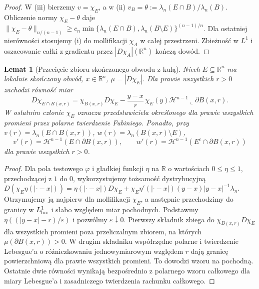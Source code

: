 \documentclass[11pt,a4paper,oneside]{book}
\numberwithin{equation}{chapter}
\theoremstyle{plain}
\newtheorem{lemat}[twierdzenie]{Lemat}
\theoremstyle{definition}
\theoremstyle{remark}
\begin{document}
\begin{proof}
W (iii) bierzemy $v=\chi_E$, a w (ii)
$v_B=\theta:=\lambda_n(E\cap B)/\lambda_n(B)$.
Obliczenie normy $\chi_E-\theta$ daje
$\|\chi_E-\theta\|_{n/(n-1)}\ge
 c_n\min\{\lambda_n(E\cap B),\lambda_n(B\setminus E)\}^{(n-1)/n}$.
Dla ostatniej nierówności stosujemy (i) do
mollifikacji $\chi_A$ w całej przestrzeni.
Zbieżność w $L^1$ i oszacowanie całki z gradientu
przez $|D\chi_A|(\mathbb R^n)$ kończą dowód.
\end{proof}

\begin{lemat}[Przecięcie zbioru skończonego obwodu z kulą]
\label{lem:dg-ball-cut}
Niech $E\subseteq\mathbb R^n$ ma lokalnie skończony obwód,
$x\in\mathbb R^n$, $\mu=|D\chi_E|$.
Dla prawie wszystkich $r>0$ zachodzi równość miar
\[
 D\chi_{E\cap B(x,r)}
 =\chi_{B(x,r)}D\chi_E
 -\frac{y-x}{r}\,\chi_E(y)
 \mathcal H^{n-1}\llcorner\partial B(x,r).
\]
W ostatnim członie $\chi_E$ oznacza przedstawiciela
określonego dla prawie wszystkich promieni przez
polarne twierdzenie Fubiniego. Ponadto, przy
$v(r)=\lambda_n(E\cap B(x,r))$,
$w(r)=\lambda_n(B(x,r)\setminus E)$,
\[
 v'(r)=\mathcal H^{n-1}(E\cap\partial B(x,r)),\qquad
 w'(r)=\mathcal H^{n-1}(E^c\cap\partial B(x,r))
\]
dla prawie wszystkich $r>0$.
\end{lemat}
\begin{proof}
Dla pola testowego $\varphi$ i gładkiej
funkcji $\eta$ na $\mathbb R$ o wartościach
$0\le\eta\le1$, przechodzącej z $1$ do $0$,
wykorzystujemy tożsamość dystrybucyjną
$D(\chi_E\eta(|\cdot-x|))=
\eta(|\cdot-x|)D\chi_E+
\chi_E\eta'(|\cdot-x|)(y-x)|y-x|^{-1}\lambda_n$.
Otrzymujemy ją najpierw dla mollifikacji $\chi_E$,
a następnie przechodzimy do granicy w $L^1_{\rm loc}$
i słabo względem miar pochodnych. Podstawmy
$\eta((|y-x|-r)/\varepsilon)$ i pozwólmy
$\varepsilon\downarrow0$. Pierwszy składnik
zbiega do $\chi_{B(x,r)}D\chi_E$ dla wszystkich
promieni poza przeliczalnym zbiorem, na których
$\mu(\partial B(x,r))>0$. W drugim składniku
współrzędne polarne i twierdzenie Lebesgue'a
o różniczkowaniu jednowymiarowym względem $r$
dają granicę powierzchniową dla prawie wszystkich
promieni. To dowodzi wzoru na pochodną.
Ostatnie dwie równości wynikają bezpośrednio
z polarnego wzoru całkowego dla miary Lebesgue'a
i zasadniczego twierdzenia rachunku całkowego.
\end{proof}
\end{document}
